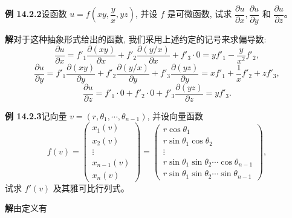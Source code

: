 \documentclass[UTF8, 12pt, fontset=fandol, oneside]{ctexart}
\begin{document}
\noindent\textbf{例 14.2.2}\quad 设函数 $u=f\left(xy,\dfrac yx,yz\right)$, 并设 $f$ 是可微函数, 试求 $\dfrac{\partial u}{\partial x}, \dfrac{\partial u}{\partial y}$ 和 $\dfrac{\partial u}{\partial z}$。

\noindent\textbf{解}\quad 对于这种抽象形式给出的函数, 我们采用上述约定的记号来求偏导数:
\[
  \frac{\partial u}{\partial x}
  =f'_1\frac{\partial(xy)}{\partial x}+f'_2\frac{\partial(y/x)}{\partial x}+f'_3\cdot0
  =yf'_1-\frac{y}{x^2}f'_2,
\]
\[
  \frac{\partial u}{\partial y}
  =f'_1\frac{\partial(xy)}{\partial y}
  +f'_2\frac{\partial(y/x)}{\partial y}
  +f'_3\frac{\partial(yz)}{\partial y}
  =xf'_1+\frac1x f'_2+zf'_3,
\]
\[
  \frac{\partial u}{\partial z}
  =f'_1\cdot0+f'_2\cdot0+f'_3\frac{\partial(yz)}{\partial z}
  =yf'_3.
\]

\noindent\textbf{例 14.2.3}\quad 记向量 $v=(r,\theta_1,\cdots,\theta_{n-1})$, 并设向量函数
\[
  f(v)=
  \begin{pmatrix}
    x_1(v)\\
    x_2(v)\\
    \vdots\\
    x_{n-1}(v)\\
    x_n(v)
  \end{pmatrix}
  =
  \begin{pmatrix}
    r\cos\theta_1\\
    r\sin\theta_1\cos\theta_2\\
    \vdots\\
    r\sin\theta_1\sin\theta_2\cdots\cos\theta_{n-1}\\
    r\sin\theta_1\sin\theta_2\cdots\sin\theta_{n-1}
  \end{pmatrix},
\]
试求 $f'(v)$ 及其雅可比行列式。

\noindent\textbf{解}\quad 由定义有
\end{document}
